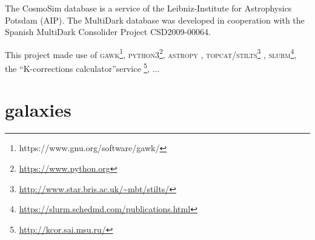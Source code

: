 \documentclass[fleqn,usenatbib,onecolumn]{mnras}
\begin{document}
The CosmoSim database is a service of the Leibniz-Institute for Astrophysics Potsdam (AIP).
The MultiDark database was developed in cooperation with the Spanish MultiDark Consolider Project CSD2009-00064.

This project made use of 
\textsc{gawk}\footnote{{https://www.gnu.org/software/gawk/}}, 
\textsc{python}3\footnote{\url{https://www.python.org}}, 
\textsc{astropy} \citep{Astropy2013AA, Astropy2018AJ}, 
\textsc{topcat/stilts}\footnote{\url{http://www.star.bris.ac.uk/~mbt/stilts/}} \citet{2006ASPC..351..666T}, 
\textsc{slurm}\footnote{\url{https://slurm.schedmd.com/publications.html}}, 
the ``K-corrections calculator''service \footnote{\url{http://kcor.sai.msu.ru/}}, 
...




 
\appendix

\section{galaxies}
\bsp	%
\label{lastpage}
\end{document}
